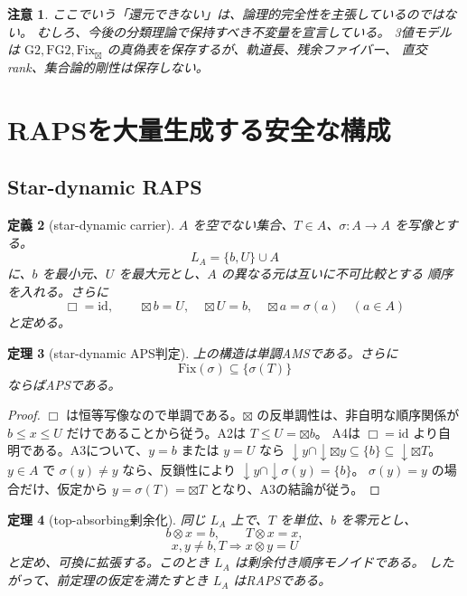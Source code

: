 \documentclass[uplatex,dvipdfmx,a4paper,10pt]{jsarticle}
\newtheorem{theorem}{定理}
\newtheorem{definition}[theorem]{定義}
\newtheorem{remark}[theorem]{注意}
\newcommand{\Gtwo}{\mathrm{G2}}
\newcommand{\FGtwo}{\mathrm{FG2}}
\newcommand{\Fix}{\mathrm{Fix}}
\newcommand{\bt}{\boxtimes}
\begin{document}
\begin{remark}
ここでいう「還元できない」は、論理的完全性を主張しているのではない。
むしろ、今後の分類理論で保持すべき不変量を宣言している。
3値モデルは \(\Gtwo,\FGtwo,\Fix_{\bt}\) の真偽表を保存するが、軌道長、残余ファイバー、
直交rank、集合論的剛性は保存しない。
\end{remark}

\section{RAPSを大量生成する安全な構成}

\subsection{Star-dynamic RAPS}

\begin{definition}[star-dynamic carrier]
\(A\) を空でない集合、\(T\in A\)、\(\sigma:A\to A\) を写像とする。
\[
L_A=\{b,U\}\cup A
\]
に、\(b\) を最小元、\(U\) を最大元とし、\(A\) の異なる元は互いに不可比較とする
順序を入れる。さらに
\[
\Box=\mathrm{id},\qquad
\bt b=U,\quad \bt U=b,\quad \bt a=\sigma(a)\quad(a\in A)
\]
と定める。
\end{definition}

\begin{theorem}[star-dynamic APS判定]
上の構造は単調AMSである。さらに
\[
\Fix(\sigma)\subseteq\{\sigma(T)\}
\]
ならばAPSである。
\end{theorem}

\begin{proof}
\(\Box\) は恒等写像なので単調である。\(\bt\) の反単調性は、非自明な順序関係が
\(b\le x\le U\) だけであることから従う。A2は \(T\le U=\bt b\)。
A4は \(\Box=\mathrm{id}\) より自明である。A3について、\(y=b\) または \(y=U\) なら
\(\downarrow y\cap\downarrow\bt y\subseteq\{b\}\subseteq\downarrow\bt T\)。
\(y\in A\) で \(\sigma(y)\ne y\) なら、反鎖性により
\(\downarrow y\cap\downarrow\sigma(y)=\{b\}\)。
\(\sigma(y)=y\) の場合だけ、仮定から \(y=\sigma(T)=\bt T\) となり、A3の結論が従う。
\end{proof}

\begin{theorem}[top-absorbing剰余化]
同じ \(L_A\) 上で、\(T\) を単位、\(b\) を零元とし、
\[
b\otimes x=b,\qquad T\otimes x=x,
\]
\[
x,y\ne b,T\Rightarrow x\otimes y=U
\]
と定め、可換に拡張する。このとき \(L_A\) は剰余付き順序モノイドである。
したがって、前定理の仮定を満たすとき \(L_A\) はRAPSである。
\end{theorem}
\end{document}
